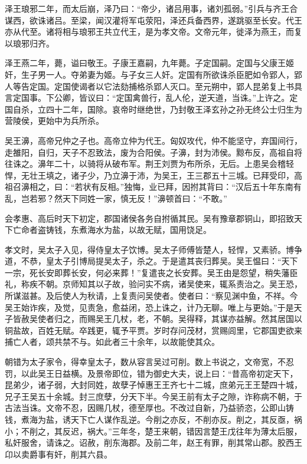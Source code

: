 \documentclass[]{article}
\begin{document}
泽王琅邪二年，而太后崩，泽乃曰：``帝少，诸吕用事，诸刘孤弱。''引兵与齐王合谋西，欲诛诸吕。至梁，闻汉灌将军屯荥阳，泽还兵备西界，遂跳驱至长安。代王亦从代至。诸将相与琅邪王共立代王，是为孝文帝。文帝元年，徙泽为燕王，而复以琅邪归齐。

泽王燕二年，薨，谥曰敬王。子康王嘉嗣，九年薨。子定国嗣。定国与父康王姬奸，生子男一人。夺弟妻为姬。与子女三人奸。定国有所欲诛杀臣肥如令郢人，郢人等告定国。定国使谒者以它法劾捕格杀郢人灭口。至元朔中，郢人昆弟复上书具言定国事。下公卿，皆议曰：``定国禽兽行，乱人伦，逆天道，当诛。''上许之。定国自杀，立四十二年，国除。哀帝时继绝世，乃封敬王泽玄孙之孙无终公士归生为营陵侯，更始中为兵所杀。

吴王濞，高帝兄仲之子也。高帝立仲为代王。匈奴攻代，仲不能坚守，弃国间行，走雒阳，自归，天子不忍致法，废为合阳侯。子濞，封为沛侯。黥布反，高祖自将往诛之。濞年二十，以骑将从破布军。荆王刘贾为布所杀，无后。上患吴会稽轻悍，无壮王填之，诸子少，乃立濞于沛，为吴王，王三郡五十三城。已拜受印，高祖召濞相之，曰：``若状有反相。''独悔，业已拜，因拊其背曰：``汉后五十年东南有乱，岂若邪？然天下同姓一家，慎无反！''濞顿首曰：``不敢。''

会孝惠、高后时天下初定，郡国诸侯各务自拊循其民。吴有豫章郡铜山，即招致天下亡命者盗铸钱，东煮海水为盐，以故无赋，国用饶足。

孝文时，吴太子入见，得侍皇太子饮博。吴太子师傅皆楚人，轻悍，又素骄。博争道，不恭，皇太子引博局提吴太子，杀之。于是遣其丧归葬吴。吴王愠曰：``天下一宗，死长安即葬长安，何必来葬！''复遣丧之长安葬。吴王由是怨望，稍失藩臣礼，称疾不朝。京师知其以子故，验问实不病，诸吴使来，辄系责治之。吴王恐，所谋滋甚。及后使人为秋请，上复责问吴使者。使者曰：``察见渊中鱼，不祥。今吴王始诈疾，及觉，见责急，愈益闭，恐上诛之，计乃无聊。唯上与更始。''于是天子皆赦吴使者归之，而赐吴王几杖，老，不朝。吴得释，其谋亦益解。然其居国以铜盐故，百姓无赋。卒践更，辄予平贾。岁时存问茂材，赏赐闾里，它郡国吏欲来捕亡人者，颂共禁不与。如此者三十余年，以故能使其众。

朝错为太子家令，得幸皇太子，数从容言吴过可削。数上书说之，文帝宽，不忍罚，以此吴王日益横。及景帝即位，错为御史大夫，说上曰：``昔高帝初定天下，昆弟少，诸子弱，大封同姓，故孽子悼惠王王齐七十二城，庶弟元王王楚四十城，兄子王吴五十余城。封三庶孽，分天下半。今吴王前有太子之隙，诈称病不朝，于古法当诛。文帝不忍，因赐几杖，德至厚也。不改过自新，乃益骄恣，公即山铸钱，煮海为盐，诱天下亡人谋作乱逆。今削之亦反，不削亦反。削之，其反亟，祸小；不削之，其反迟，祸大。''三年冬，楚王来朝，错因言楚王戊往年为薄太后服，私奸服舍，请诛之。诏赦，削东海郡。及前二年，赵王有罪，削其常山郡。胶西王卬以卖爵事有奸，削其六县。
\end{document}
